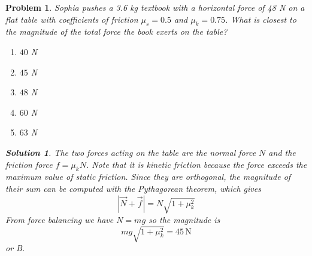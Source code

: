 \documentclass[12pt]{article}
\newcommand{\clearpts}{\addtocounter{tpts}{\value{cpts}} \setcounter{cpts}{0}}
\newcommand{\pts}[1]{\clearpts \setcounter{cpts}{#1}}
\newtheorem*{solution}{Solution}
\theoremstyle{mystyle}
\newtheorem{pproblem}{Problem}
\begin{document}
\pts{2}
\begin{pproblem}
    Sophia pushes a 3.6 kg textbook with a horizontal force of 48 N on a flat table with coefficients of friction $\mu_s = 0.5$ and $\mu_k = 0.75$. What is closest to the magnitude of the total force the book exerts on the table?
    \begin{enumerate}[label=(\Alph*)]
        \item $40$ N
        \item $45$ N
        \item $48$ N
        \item $60$ N
        \item $63$ N
    \end{enumerate}
    \begin{solution}
        The two forces acting on the table are the normal force $N$ and the friction force $f=\mu_k N$.
        Note that it is kinetic friction because the force exceeds the maximum value of static friction.
        Since they are orthogonal, the magnitude of their sum can be computed with the Pythagorean theorem, which gives \[
            \left|\vec N+\vec f\right|=N\sqrt{1+\mu_k^2}
        \]
        From force balancing we have $N=mg$ so the magnitude is\[
            mg\sqrt{1+\mu_k^2}=\boxed{45\,\text{N}}
        \]
        or B.
    \end{solution}
\end{pproblem}
\end{document}
